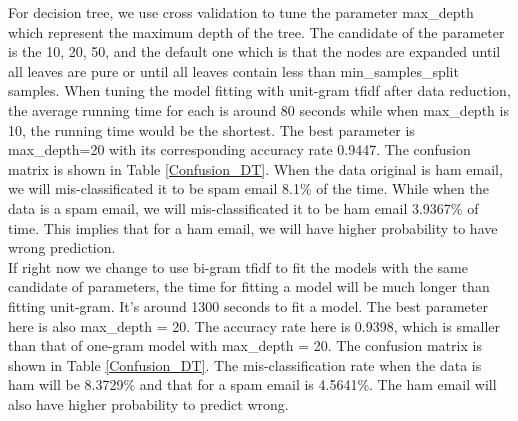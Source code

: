 For decision tree, we use cross validation to tune the parameter max\_depth which represent the maximum depth of the tree. The candidate of the parameter is the 10, 20, 50, and the default one which is that the nodes are expanded until all leaves are pure or until all leaves contain less than min\_samples\_split samples. When tuning the model fitting with unit-gram tfidf after data reduction, the average running time for each is around 80 seconds while when max\_depth is 10, the running time would be the shortest. The best parameter is max\_depth=20 with its corresponding accuracy rate 0.9447. The confusion matrix is shown in Table \ref{Confusion_DT}. When the data original is ham email, we will mis-classificated it to be spam email 8.1\% of the time. While when the data is a spam email, we will mis-classificated it to be ham email 3.9367\% of time. This implies that for a ham email, we will have higher probability to have wrong prediction.\\

If right now we change to use bi-gram tfidf to fit the models with the same candidate of parameters, the time for fitting a model will be much longer than fitting unit-gram. It's around 1300 seconds to fit a model. The best parameter here is also max\_depth = 20. The accuracy rate here is 0.9398, which is smaller than that of one-gram model with max\_depth = 20. The confusion matrix is shown in Table \ref{Confusion_DT}. The mis-classification rate when the data is ham will be 8.3729\% and that for a spam email is 4.5641\%. The ham email will also have higher probability to predict wrong. 


